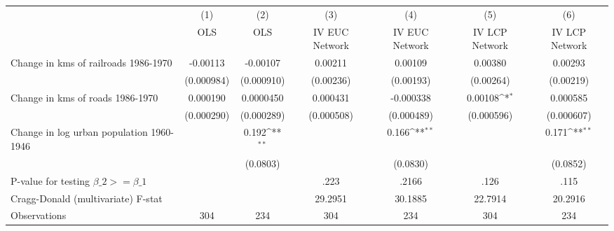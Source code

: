 {
\def\sym#1{\ifmmode^{#1}\else\(^{#1}\)\fi}
\begin{tabular}{l*{6}{c}}
\hline\hline
                &\multicolumn{1}{c}{(1)}&\multicolumn{1}{c}{(2)}&\multicolumn{1}{c}{(3)}&\multicolumn{1}{c}{(4)}&\multicolumn{1}{c}{(5)}&\multicolumn{1}{c}{(6)}\\
                &\multicolumn{1}{c}{OLS}&\multicolumn{1}{c}{OLS}&\multicolumn{1}{c}{IV EUC Network}&\multicolumn{1}{c}{IV EUC Network}&\multicolumn{1}{c}{IV LCP Network}&\multicolumn{1}{c}{IV LCP Network}\\
\hline
Change in kms of railroads 1986-1970& -0.00113         & -0.00107         &  0.00211         &  0.00109         &  0.00380         &  0.00293         \\
                &(0.000984)         &(0.000910)         &(0.00236)         &(0.00193)         &(0.00264)         &(0.00219)         \\
[1em]
Change in kms of roads 1986-1970& 0.000190         &0.0000450         & 0.000431         &-0.000338         &  0.00108\sym{*}  & 0.000585         \\
                &(0.000290)         &(0.000289)         &(0.000508)         &(0.000489)         &(0.000596)         &(0.000607)         \\
[1em]
Change in log urban population 1960-1946&                  &    0.192\sym{**} &                  &    0.166\sym{**} &                  &    0.171\sym{**} \\
                &                  & (0.0803)         &                  & (0.0830)         &                  & (0.0852)         \\
\hline
P-value for testing $\beta\_{2} >= \beta\_{1}$&                  &                  &     .223         &    .2166         &     .126         &     .115         \\
Cragg-Donald (multivariate) F-stat&                  &                  &  29.2951         &  30.1885         &  22.7914         &  20.2916         \\
Observations    &      304         &      234         &      304         &      234         &      304         &      234         \\
\hline\hline
\end{tabular}
}
